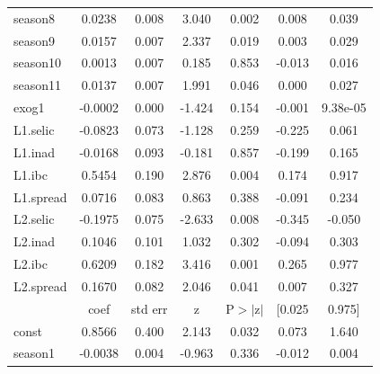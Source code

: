 \documentclass[a4paper,
               article,
               12pt,
               openany,
               oneside,
               english,
               brazil]{abntex2}
\numberwithin{equation}{section}
\begin{document}
\begin{longtable}{lcccccc}
    season8   &       0.0238  &        0.008     &     3.040  &         0.002        &        0.008    &        0.039     \\
    season9   &       0.0157  &        0.007     &     2.337  &         0.019        &        0.003    &        0.029     \\
    season10  &       0.0013  &        0.007     &     0.185  &         0.853        &       -0.013    &        0.016     \\
    season11  &       0.0137  &        0.007     &     1.991  &         0.046        &        0.000    &        0.027     \\
    exog1     &      -0.0002  &        0.000     &    -1.424  &         0.154        &       -0.001    &     9.38e-05     \\
    L1.selic  &      -0.0823  &        0.073     &    -1.128  &         0.259        &       -0.225    &        0.061     \\
    L1.inad   &      -0.0168  &        0.093     &    -0.181  &         0.857        &       -0.199    &        0.165     \\
    L1.ibc    &       0.5454  &        0.190     &     2.876  &         0.004        &        0.174    &        0.917     \\
    L1.spread &       0.0716  &        0.083     &     0.863  &         0.388        &       -0.091    &        0.234     \\
    L2.selic  &      -0.1975  &        0.075     &    -2.633  &         0.008        &       -0.345    &       -0.050     \\
    L2.inad   &       0.1046  &        0.101     &     1.032  &         0.302        &       -0.094    &        0.303     \\
    L2.ibc    &       0.6209  &        0.182     &     3.416  &         0.001        &        0.265    &        0.977     \\
    L2.spread &       0.1670  &        0.082     &     2.046  &         0.041        &        0.007    &        0.327     \\
    \toprule
    & coef & std err & z & P$> |$z$|$ & [0.025 & 0.975]  \\
    \midrule
    const     &       0.8566  &        0.400     &     2.143  &         0.032        &        0.073    &        1.640     \\
    season1   &      -0.0038  &        0.004     &    -0.963  &         0.336        &       -0.012    &        0.004     \\

\end{longtable}
\end{document}
